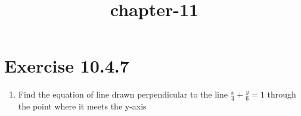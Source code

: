 \documentclass[12pt]{article}
\begin{document}
\begin{center}
\title{\textbf{chapter-11}}
\date{\vspace{-5ex}} %
\maketitle
\end{center}
\setcounter{page}{1}
\section{Exercise 10.4.7}

\begin{enumerate}
\item Find the equation of line  drawn perpendicular to the line $\frac{x}{4}+\frac{y}{6}=1$ through the point where it meets the y-axis \\

\end{enumerate}
\end{document}
